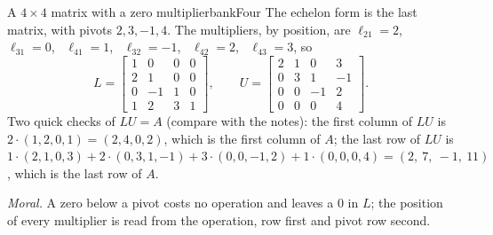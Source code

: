\documentclass[11pt]{article}
\begin{document}
\begin{exmp}{A $4\times4$ matrix with a zero multiplier}{bankFour}
The echelon form is the last matrix, with pivots $2,3,-1,4$. The multipliers, by position, are $\ell_{21}=2$, \ $\ell_{31}=0$, \ $\ell_{41}=1$, \ $\ell_{32}=-1$, \ $\ell_{42}=2$, \ $\ell_{43}=3$, so
\[
L=\begin{bmatrix}1&0&0&0\\2&1&0&0\\0&-1&1&0\\1&2&3&1\end{bmatrix},\qquad U=\begin{bmatrix}2&1&0&3\\0&3&1&-1\\0&0&-1&2\\0&0&0&4\end{bmatrix}.
\]
Two quick checks of $LU=A$ (compare with the notes): the first column of $LU$ is $2\cdot(1,2,0,1)=(2,4,0,2)$, which is the first column of $A$; the last row of $LU$ is $1\cdot(2,1,0,3)+2\cdot(0,3,1,-1)+3\cdot(0,0,-1,2)+1\cdot(0,0,0,4)=(2,\ 7,\ -1,\ 11)$, which is the last row of $A$.

\emph{Moral.} A zero below a pivot costs no operation and leaves a $0$ in $L$; the position of every multiplier is read from the operation, row first and pivot row second.
\end{exmp}
\end{document}
